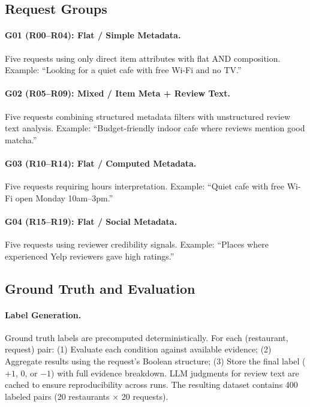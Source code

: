 \subsection{Request Groups}

\paragraph{G01 (R00--R04): Flat / Simple Metadata.}
Five requests using only direct item attributes with flat AND composition.
Example: ``Looking for a quiet cafe with free Wi-Fi and no TV.''

\paragraph{G02 (R05--R09): Mixed / Item Meta + Review Text.}
Five requests combining structured metadata filters with unstructured review text analysis.
Example: ``Budget-friendly indoor cafe where reviews mention good matcha.''

\paragraph{G03 (R10--R14): Flat / Computed Metadata.}
Five requests requiring hours interpretation.
Example: ``Quiet cafe with free Wi-Fi open Monday 10am--3pm.''

\paragraph{G04 (R15--R19): Flat / Social Metadata.}
Five requests using reviewer credibility signals.
Example: ``Places where experienced Yelp reviewers gave high ratings.''

\subsection{Ground Truth and Evaluation}

\paragraph{Label Generation.}
Ground truth labels are precomputed deterministically.
For each (restaurant, request) pair:
(1) Evaluate each condition against available evidence;
(2) Aggregate results using the request's Boolean structure;
(3) Store the final label ($+1$, $0$, or $-1$) with full evidence breakdown.
LLM judgments for review text are cached to ensure reproducibility across runs.
The resulting dataset contains 400 labeled pairs (20 restaurants $\times$ 20 requests).

